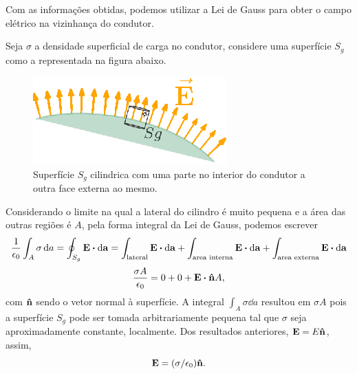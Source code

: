 Com as informações obtidas, podemos utilizar a Lei de Gauss para obter o campo elétrico na vizinhança do condutor.

Seja $\sigma$ a densidade superficial de carga no condutor, considere uma superfície $S_g$ como a representada na figura abaixo.

\begin{figure}[h]
  \center
  \includegraphics[scale = 1.1]{./imgs/gauss.eps}
  \caption{Superfície $S_g$ cilindrica com uma parte no interior do condutor a outra face externa ao mesmo.}
\end{figure}

Considerando o limite na qual a lateral do cilindro é muito pequena e a área das outras regiões é $A$, pela forma integral da Lei de Gauss, podemos escrever
\begin{align*}
  \frac{1}{\epsilon_0} \int_A \sigma \dd{a} = \oint_{S_g} \vb{E} \vdot \dd{\vb{a}} = \int_\text{lateral} \vb{E} \vdot \dd{\vb{a}} + \int_\text{area interna} \vb{E} \vdot \dd{\vb{a}} + \int_\text{area externa} \vb{E} \vdot \dd{\vb{a}}
\end{align*}
\begin{align*}
  \frac{\sigma A}{\epsilon_0} = 0 + 0 + \vb{E} \vdot \vu{n} A,
\end{align*}
com $\vu{n}$ sendo o vetor normal à superfície. A integral $\int_A \sigma \dd{a}$ resultou em $\sigma A$ pois a superfície $S_g$ pode ser tomada arbitrariamente pequena tal que $\sigma$ seja aproximadamente constante, localmente.
Dos resultados anteriores, $\vb{E} = E \vu{n}$, assim,
\begin{equation*}
  \vb{E} = (\sigma/\epsilon_0) \vu{n}.
\end{equation*}


\newpage
{} 

